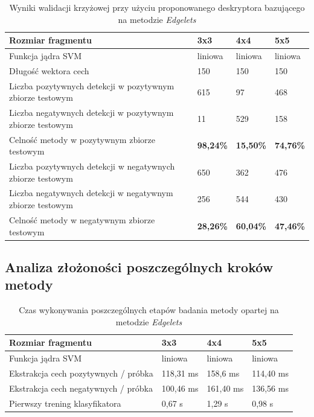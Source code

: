 \begin{center}
    \begin{longtable}{ | p{5cm} | p{3cm} | p{3cm} | p{3cm} |}
    \caption{Wyniki walidacji krzyżowej przy użyciu proponowanego deskryptora bazującego na metodzie \textit{Edgelets}}
    \label{tab:edge_first}\\
    \hline
	Rozmiar fragmentu & 3x3 & 4x4 & 5x5 \\ \hline
	Funkcja jądra SVM & liniowa & liniowa & liniowa  \\ \hline
    Długość wektora cech & 150 & 150 & 150 \\ \hline
    Liczba pozytywnych detekcji w pozytywnym zbiorze testowym & 615 & 97 & 468 \\ \hline
    Liczba negatywnych detekcji w pozytywnym zbiorze testowym & 11 & 529 & 158 \\ \hline
    Celność metody w pozytywnym zbiorze testowym & \textbf{98,24\%} & \textbf{15,50\%} & \textbf{74,76\%} \\ \hline
    Liczba pozytywnych detekcji w negatywnych zbiorze testowym & 650 & 362 & 476 \\ \hline
    Liczba negatywnych detekcji w negatywnym zbiorze testowym & 256 & 544 & 430 \\ \hline
    Celność metody w negatywnym zbiorze testowym & \textbf{28,26\%} & \textbf{60,04\%} & \textbf{47,46\%} \\ \hline
    \end{longtable}
\end{center}

\subsection{Analiza złożoności poszczególnych kroków metody}

\begin{center}
    \begin{longtable}{ | p{5cm} | p{3cm} | p{3cm} | p{3cm} |}
    \caption{Czas wykonywania poszczególnych etapów badania metody opartej na metodzie \textit{Edgelets}}
    \label{ref:edge_times}\\
    \hline
	Rozmiar fragmentu & 3x3 & 4x4 & 5x5 \\ \hline
	Funkcja jądra SVM & liniowa & liniowa & liniowa  \\ \hline
    Ekstrakcja cech pozytywnych / próbka & 118,31 ms & 158,6 ms & 114,40 ms \\ \hline
    Ekstrakcja cech negatywnych / próbka & 100,46 ms & 161,40 ms & 136,56 ms \\ \hline
    Pierwszy trening klasyfikatora & 0,67 s & 1,29 s & 0,98 s \\ \hline
    \end{longtable}
\end{center}


